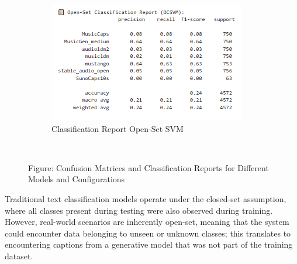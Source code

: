 \documentclass[conference]{IEEEtran}  %
\begin{document}
\begin{figure}
\begin{subfigure}[b]{0.32\textwidth}
        \centering
        \includegraphics[width=\linewidth]{Figures/OpenSetSVM.PNG}
        \caption{Classification Report Open-Set SVM}
        \label{fig: Open-Set SVM Report}
    \end{subfigure}
\\
    \caption*{Figure: Confusion Matrices and Classification Reports for Different Models and Configurations} %
\label{fig:all_conf_matrices} %
\end{figure}

Traditional text classification models operate under the closed-set assumption, where all classes present during testing were also observed during training. However, real-world scenarios are inherently open-set, meaning that the system could encounter data belonging to unseen or unknown classes; this translates to encountering captions from a generative model that was not part of the training dataset. 
\end{document}
